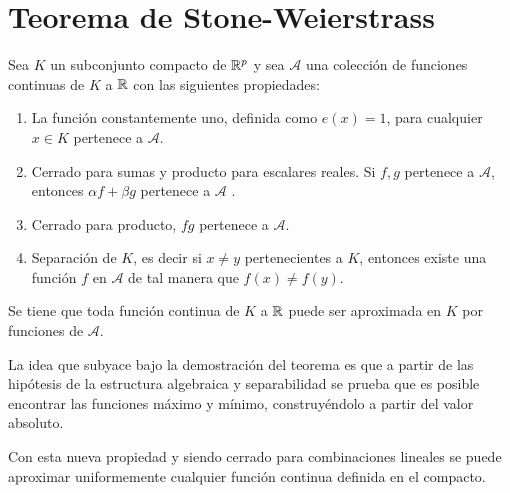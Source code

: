 %

\chapter{Teorema de Stone-Weierstrass }\label{ch:TeoremaStoneWeiertrass}

\begin{teorema}

    Sea $K$ un subconjunto compacto de $\mathbb{R}^p$ y sea $\mathcal{A}$ una colección de 
    funciones continuas de $K$ a $\mathbb{R}$ con las siguientes propiedades: 

    \begin{enumerate}
        \item La función constantemente uno, definida como $e(x)=1$, para cualquier $x\in K$ pertenece a $\mathcal{A}$.
        \item Cerrado para sumas y producto para escalares reales. Si $f,g$ pertenece a  $\mathcal{A}$, entonces $\alpha f + \beta g$ pertenece a $\mathcal{A}$ . 
        \item Cerrado para producto, $fg$ pertenece a $\mathcal{A}$. 
        \item Separación de $K$, es decir si $x \neq y$ pertenecientes a $K$, entonces existe una función $f$ en $\mathcal{A}$  de tal manera que $f(x) \neq f(y)$. 
    \end{enumerate}
    
    Se tiene que toda función continua de $K$ a $\mathbb{R}$ puede ser aproximada en $K$ por funciones de $\mathcal A$. 

\end{teorema}  

La idea que subyace bajo la demostración del teorema es que a partir de las hipótesis de la estructura algebraica y separabilidad se prueba que es posible encontrar las funciones máximo y mínimo, construyéndolo a partir del valor absoluto.   

Con esta nueva propiedad y siendo cerrado para combinaciones lineales se puede aproximar uniformemente cualquier función continua definida en el compacto. 


